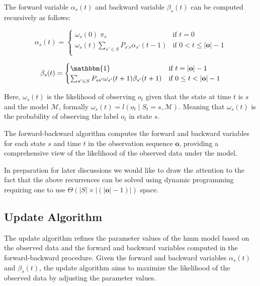 The forward variable $\alpha_s(t)$ and backward variable $\beta_s(t)$ can be computed recursively as follows:

\begin{equation}
    \alpha_s(t) =
    \begin{cases}
        \omega_s(0) \; \pi_s & \text{if } t = 0 \\
        \omega_s(t) \sum_{s' \in S} P_{s's}\alpha_{s'}(t - 1) & \text{if } 0 < t \leq |\mathbf{o}| - 1 \\
    \end{cases}
    \label{eq:forward-recursive}
\end{equation}


\begin{equation}
    \beta_s(t) =
    \begin{cases}
        \mathbbm{1} & \text{if } t = |\mathbf{o}| - 1 \\
        \sum_{s' \in S} P_{ss'} \omega_{s'}(t + 1) \beta_{s'}(t + 1) & \text{if } 0 \leq t < |\mathbf{o}| - 1 \\
    \end{cases}
    \label{eq:backward-recursive}
\end{equation}


Here, $\omega_{s}(t)$ is the likelihood of observing $o_t$ given that the state at time $t$ is $s$ and the model $\mathcal{M}$, formally $\omega_s(t) = l(o_t \mid S_t = s, \mathcal{M})$.
Meaning that $\omega_s(t)$ is the probability of observing the label $o_t$ in state $s$.

The forward-backward algorithm computes the forward and backward variables for each state $s$ and time $t$ in the observation sequence $\mathbf{o}$, providing a comprehensive view of the likelihood of the observed data under the model.

In preparation for later discussions we would like to draw the attention to the fact that the above recurrences can be solved using dynamic programming requiring one to use $\Theta(|S|\times|(|\mathbf{o}|-1)|)$ space.


\subsection{Update Algorithm}\label{subsec:update-algorithm}
The update algorithm refines the parameter values of the \gls{hmm} model based on the observed data and the forward and backward variables computed in the forward-backward procedure.
Given the forward and backward variables $\alpha_s(t)$ and $\beta_s(t)$, the update algorithm aims to maximize the likelihood of the observed data by adjusting the parameter values.

